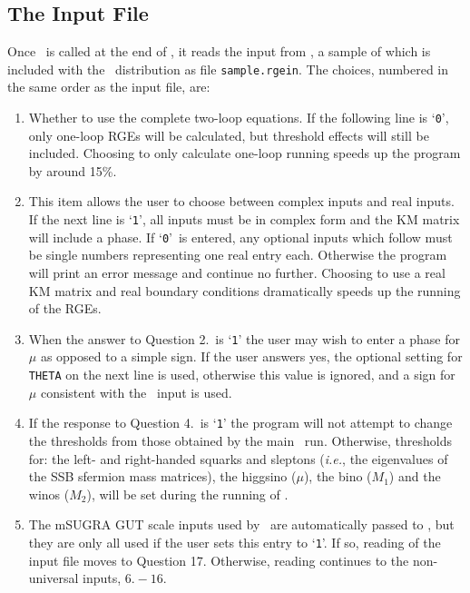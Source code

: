 \subsection{The Input File} Once \progrge~is called at the end of
\progisasug, it reads the input from \inrge, a sample of which is
included with the
\progisa~distribution as file \texttt{sample.rgein}.  The choices, numbered
in the same order as the input file, are:
\begin{enumerate}
\item Whether to use the complete two-loop equations. If the following line is `\verb+0+', only one-loop RGEs will be calculated, but threshold effects will still be included. Choosing to only calculate one-loop running speeds up the program by around 15\%.
\item This item allows the user to choose between complex inputs and real inputs. If the next line is `\verb+1+', all inputs must be in complex form and the KM matrix will include a phase. If `\verb+0+'~is entered, any optional inputs which follow must be single numbers representing one real entry each. Otherwise the program will print an error message and continue no further. Choosing to use a real KM matrix and real boundary conditions dramatically speeds up the running of the RGEs.
\item When the answer to Question 2.~is `\verb+1+' the user may wish to enter a phase for $\mu$ as opposed to a simple sign. If the  user answers yes, the optional setting for \texttt{THETA} on the next line is used, otherwise this value is ignored, and a sign for $\mu$ consistent with the \progisasug~input is used.
\item If the response to Question 4.~is `\verb+1+' the program will not attempt to change the thresholds from those obtained by the main \progisasug~run. Otherwise, thresholds for: the left- and right-handed squarks and sleptons (\textit{i.e.}, the eigenvalues of the SSB sfermion mass matrices), the higgsino ($\mu$), the bino ($M_{1}$) and the winos ($M_{2}$), will be set during the running of \progrge.
\item The mSUGRA GUT scale inputs used by \progisasug~are automatically passed to \progrge, but they are only all used if the user sets this entry to `\verb+1+'. If so, reading of the input file moves to Question 17. Otherwise, reading continues to the non-universal inputs, $6.-16.$
\end{enumerate}

